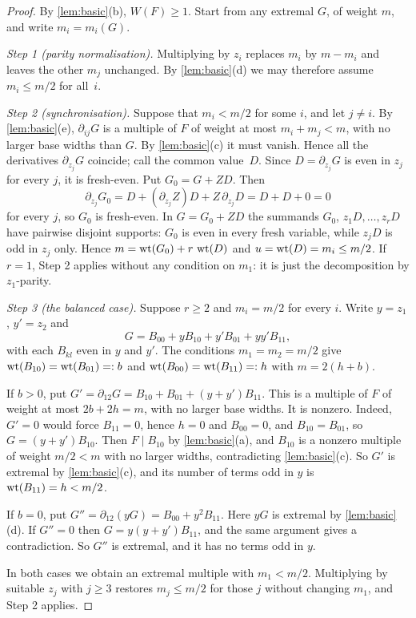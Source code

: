 \begin{proof}
By \cref{lem:basic}(b), $W(F)\ge1$. Start from any extremal $G$, of weight $m$, and write $m_i=m_i(G)$.

\emph{Step 1 (parity normalisation).} Multiplying by $z_i$ replaces $m_i$ by $m-m_i$ and leaves the other $m_j$ unchanged. By \cref{lem:basic}(d) we may therefore assume $m_i\le m/2$ for all~$i$.

\emph{Step 2 (synchronisation).} Suppose that $m_i<m/2$ for some $i$, and let $j\ne i$. By \cref{lem:basic}(e), $\partial_{ij}G$ is a multiple of $F$ of weight at most $m_i+m_j<m$, with no larger base widths than $G$. By \cref{lem:basic}(c) it must vanish. Hence all the derivatives $\partial_{z_j}G$ coincide; call the common value~$D$. Since $D=\partial_{z_j}G$ is even in $z_j$ for every $j$, it is fresh-even. Put $G_0=G+ZD$. Then
\[
 \partial_{z_j}G_0=D+(\partial_{z_j}Z)D+Z\,\partial_{z_j}D=D+D+0=0
\]
for every $j$, so $G_0$ is fresh-even. In $G=G_0+ZD$ the summands $G_0$, $z_1D,\dots,z_rD$ have pairwise disjoint supports: $G_0$ is even in every fresh variable, while $z_jD$ is odd in $z_j$ only. Hence $m=\operatorname{wt}(G_0)+r\,\operatorname{wt}(D)$ and $u=\operatorname{wt}(D)=m_i\le m/2$. If $r=1$, Step 2 applies without any condition on $m_1$: it is just the decomposition by $z_1$-parity.

\emph{Step 3 (the balanced case).} Suppose $r\ge2$ and $m_i=m/2$ for every $i$. Write $y=z_1$, $y'=z_2$ and
\[
 G=B_{00}+yB_{10}+y'B_{01}+yy'B_{11},
\]
with each $B_{kl}$ even in $y$ and $y'$. The conditions $m_1=m_2=m/2$ give $\operatorname{wt}(B_{10})=\operatorname{wt}(B_{01})=:b$ and $\operatorname{wt}(B_{00})=\operatorname{wt}(B_{11})=:h$ with $m=2(h+b)$.

If $b>0$, put $G'=\partial_{12}G=B_{10}+B_{01}+(y+y')B_{11}$. This is a multiple of $F$ of weight at most $2b+2h=m$, with no larger base widths. It is nonzero. Indeed, $G'=0$ would force $B_{11}=0$, hence $h=0$ and $B_{00}=0$, and $B_{10}=B_{01}$, so $G=(y+y')B_{10}$. Then $F\mid B_{10}$ by \cref{lem:basic}(a), and $B_{10}$ is a nonzero multiple of weight $m/2<m$ with no larger widths, contradicting \cref{lem:basic}(c). So $G'$ is extremal by \cref{lem:basic}(c), and its number of terms odd in $y$ is $\operatorname{wt}(B_{11})=h<m/2$.

If $b=0$, put $G''=\partial_{12}(yG)=B_{00}+y^2B_{11}$. Here $yG$ is extremal by \cref{lem:basic}(d). If $G''=0$ then $G=y(y+y')B_{11}$, and the same argument gives a contradiction. So $G''$ is extremal, and it has no terms odd in $y$.

In both cases we obtain an extremal multiple with $m_1<m/2$. Multiplying by suitable $z_j$ with $j\ge3$ restores $m_j\le m/2$ for those $j$ without changing $m_1$, and Step 2 applies.


\end{proof}
